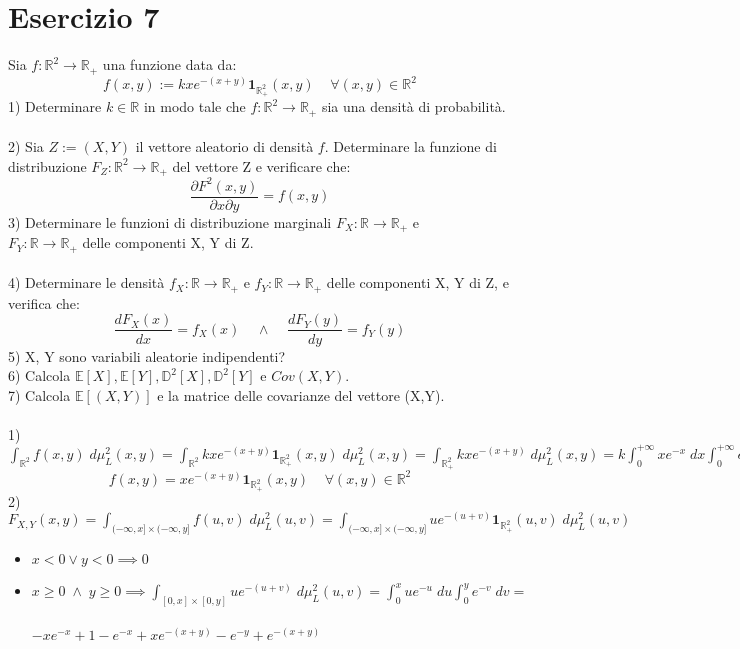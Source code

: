 \documentclass{article}
\begin{document}
\section*{Esercizio 7}
Sia $f: \mathbb{R}^{2} \to \mathbb{R}_{+}$ una funzione data da:
\[ f(x,y) := kxe^{-(x+y)} \mathbf{1}_{\mathbb{R}_{+}^{2}}(x,y) \; \; \; \; \forall (x,y) \in \mathbb{R}^{2} \]
1) Determinare $k \in \mathbb{R}$ in modo tale che $f: \mathbb{R}^{2} \to \mathbb{R}_{+}$ sia una densità di probabilità.\\
\\
2) Sia $Z := (X,Y)$ il vettore aleatorio di densità $f$. Determinare la funzione di distribuzione $F_{Z}: \mathbb{R}^{2} \to \mathbb{R}_{+}$ del vettore Z e verificare che:
\[ \frac{\partial F^{2}(x,y)}{\partial x \partial y} = f(x,y) \]
3) Determinare le funzioni di distribuzione marginali $F_{X}: \mathbb{R} \to \mathbb{R}_{+}$ e\\
$F_{Y}: \mathbb{R} \to \mathbb{R}_{+}$ delle componenti X, Y di Z.\\
\\
4) Determinare le densità $f_{X}:\mathbb{R} \to \mathbb{R}_{+}$ e $f_{Y}:\mathbb{R} \to \mathbb{R}_{+}$ delle componenti X, Y di Z, e verifica che:
\[ \frac{dF_{X}(x)}{dx} = f_{X}(x) \; \; \; \; \wedge \; \; \; \; \frac{dF_{Y}(y)}{dy} = f_{Y}(y) \]
5) X, Y sono variabili aleatorie indipendenti?\\
6) Calcola $\mathbb{E}[X], \mathbb{E}[Y], \mathbb{D}^{2}[X], \mathbb{D}^{2}[Y]$ e $Cov(X,Y)$.\\
7) Calcola $\mathbb{E}[(X,Y)]$ e la matrice delle covarianze del vettore (X,Y).\\
\\
1) $\int_{\mathbb{R}^{2}}^{}f(x,y) \; d\mu_{L}^{2}(x,y) = \int_{\mathbb{R}^{2}}^{}kxe^{-(x+y)} \mathbf{1}_{\mathbb{R}_{+}^{2}}(x,y) \; d\mu_{L}^{2}(x,y) = \int_{\mathbb{R}_{+}^{2}}^{}kxe^{-(x+y)} \; d\mu_{L}^{2}(x,y) = k\int_{0}^{+\infty}xe^{-x} \; dx \int_{0}^{+\infty}e^{-y} \; dy = k \implies k=1$
\[ f(x,y) = xe^{-(x+y)} \mathbf{1}_{\mathbb{R}_{+}^{2}}(x,y) \; \; \; \; \forall (x,y) \in \mathbb{R}^{2} \]
2) $F_{X,Y}(x,y) = \int_{(-\infty, x]\times(-\infty, y]}^{}f(u,v) \; d\mu_{L}^{2}(u,v) = \int_{(-\infty, x]\times(-\infty, y]}^{}ue^{-(u+v)} \mathbf{1}_{\mathbb{R}_{+}^{2}}(u,v) \; d\mu_{L}^{2}(u,v)$
\begin{itemize}
\item $x<0 \vee y<0 \implies 0$
\item $x \geq 0 \; \wedge \; y \geq 0 \implies \int_{[0,x]\times[0,y]}^{}ue^{-(u+v)} \; d\mu_{L}^{2}(u,v) = \int_{0}^{x}ue^{-u} \; du \int_{0}^{y}e^{-v} \; dv =$\\ \\
$-xe^{-x}+1-e^{-x}+xe^{-(x+y)}-e^{-y}+e^{-(x+y)}$
\end{itemize}
\end{document}
